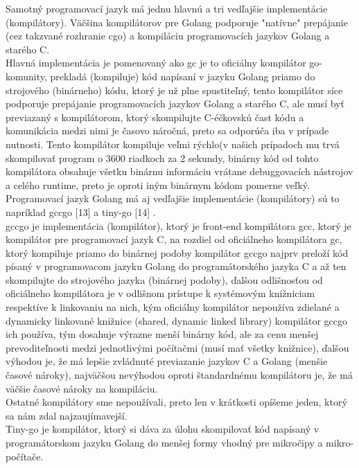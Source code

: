 \tab[5 mm] Samotný programovací jazyk má jednu hlavnú a tri vedľajšie implementácie (kompilátory). 
Väčšina kompilátorov pre Golang podporuje "natívne" prepájanie (cez takzvané rozhranie cgo) a kompiláciu programovacích jazykov Golang a starého C.\\
\tab[5 mm] Hlavná implementácia je pomenovaný ako gc je to oficiálny kompilátor go-komunity,
prekladá (kompiluje) kód napísaní v jazyku Golang priamo do strojového (binárneho) kódu, ktorý 
je už plne spustiteľný, tento kompilátor síce podporuje prepájanie programovacích jazykov Golang a starého C, ale musí byť previazaný s kompilátorom, ktorý skompilujte C-éčkovskú čast kódu a komunikácia medzi nimi je časovo náročná, preto sa odporúča iba v prípade nutnosti. Tento kompilátor kompiluje veľmi rýchlo(v našich prípadoch mu trvá skompilovať program o 3600 riadkoch za 2 sekundy, binárny kód od tohto kompilátora obsahuje všetku binárnu informáciu vrátane debuggovacích nástrojov a celého runtime, preto je oproti iným binárnym kódom pomerne veľký.\\ 
\tab[5 mm] Programovací jazyk Golang má aj vedľajšie implementácie (kompilátory) sú to napríklad gccgo [13] a tiny-go [14] .\\
\tab[5 mm] gccgo je implementácia (kompilátor), ktorý je front-end kompilátora gcc, ktorý je kompilátor pre programovací jazyk C, na rozdiel od oficiálneho kompilátora gc, ktorý kompiluje priamo do binárnej podoby kompilátor gccgo najprv preloží kód písaný v programovacom jazyku Golang do programátorského jazyka C a až ten skompilujte do strojového jazyka (binárnej podoby), ďalšou odlišnosťou od oficiálneho kompilátora je v odlišnom prístupe k systémovým knižniciam respektíve k linkovaniu na nich, kým oficiálny kompilátor nepoužíva zdielané a dynamicky linkované knižnice (shared, dynamic linked library) kompilátor gccgo ich používa, tým dosahuje výrazne menší binárny kód, ale za cenu menšej prevoditeľnosti medzi jednotlivými počítačmi (musí mať všetky knižnice), ďalšou výhodou je, že má lepšie zvládnuté previazanie jazykov C a Golang (menšie časové nároky), najväčšou nevýhodou oproti štandardnému kompilátoru je, že má väčšie časové nároky na kompiláciu. \\
\tab[5 mm] Ostatné kompilátory sme nepoužívali, preto len v krátkosti opíšeme jeden, ktorý sa nám zdal najzaujímavejší. \\
Tiny-go je kompilátor, ktorý si dáva za úlohu skompilovať kód napísaný v programátorskom jazyku Golang do menšej formy vhodný pre mikročipy a mikro-počítače.\\ 
